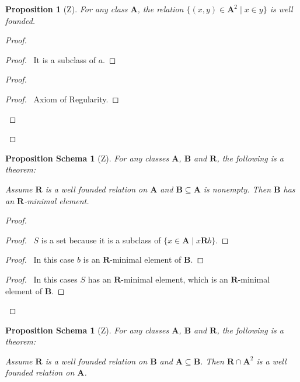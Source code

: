 \documentclass{book}
\let\qed\relax
\newtheorem{prop}[ax]{Proposition}
\newtheorem{props}[ax]{Proposition Schema}
\theoremstyle{definition}
\begin{document}
\begin{prop}[Z]
\label{prop:inwellfounded}
For any class $\mathbf{A}$, the relation $\{ (x,y) \in \mathbf{A}^2 \mid x \in y \}$ is well founded.
\end{prop}

\begin{proof}
\pf
{}
\begin{proof}
	\pf\ It is a subclass of $a$.
\end{proof}
\begin{proof}
	\begin{proof}
		\pf\ Axiom of Regularity.
	\end{proof}
\end{proof}
\qed
\end{proof}

\begin{props}[Z]
\label{prop:leastelement}
For any classes $\mathbf{A}$, $\mathbf{B}$ and $\mathbf{R}$, the following is a theorem:

Assume $\mathbf{R}$ is a well founded relation on $\mathbf{A}$ and $\mathbf{B} \subseteq \mathbf{A}$ is nonempty. Then $\mathbf{B}$ has an $\mathbf{R}$-minimal element.
\end{props}

\begin{proof}
\pf
{}
\begin{proof}
	\pf\ $S$ is a set because it is a subclass of $\{ x \in \mathbf{A} \mid x \mathbf{R} b \}$.
\end{proof}
\begin{proof}
	\pf\ In this case $b$ is an $\mathbf{R}$-minimal element of $\mathbf{B}$.
\end{proof}
\begin{proof}
	\pf\ In this cases $S$ has an $\mathbf{R}$-minimal element, which is an $\mathbf{R}$-minimal element of $\mathbf{B}$.
\end{proof}
\qed
\end{proof}

\begin{props}[Z]
\label{prop:subwellfounded}
For any classes $\mathbf{A}$, $\mathbf{B}$ and $\mathbf{R}$, the following is a theorem:

Assume $\mathbf{R}$ is a well founded relation on $\mathbf{B}$ and $\mathbf{A} \subseteq \mathbf{B}$. Then $\mathbf{R} \cap \mathbf{A}^2$ is a well founded relation on $\mathbf{A}$.
\end{props}
\end{document}
